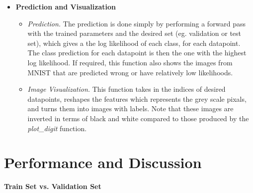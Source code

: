 \documentclass{article} %
\begin{document}
\begin{itemize}
  \item \textbf{Prediction and Visualization}
  \begin{itemize}
    \item \textit{Prediction.} The prediction is done simply by performing a forward pass with the trained parameters and the desired set (eg. validation or test set), which gives a the log likelihood of each class, for each datapoint. The class prediction for each datapoint is then the one with the highest log likelihood. If required, this function also shows the images from MNIST that are predicted wrong or have relatively low likelihoods.

    \item \textit{Image Visualization.} This function takes in the indices of desired datapoints, reshapes the features which represents the grey scale pixals, and turns them into images with labels. Note that these images are inverted in terms of black and white compared to those produced by the \textit{plot\_digit} function.
  \end{itemize}
\end{itemize}



\vspace{0.3cm}
\section*{Performance and Discussion} %

\textbf{Train Set vs. Validation Set}
\end{document}
